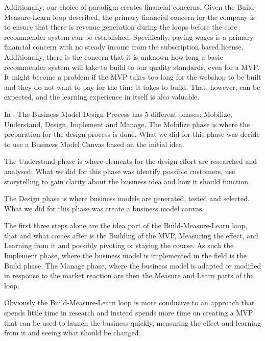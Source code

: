 Additionally, our choice of paradigm creates financial concerns. 
Given the Build-Measure-Learn loop described, the primary financial concern for the company is to ensure that there is revenue generation during the loops before the core recommender system can be established. 
Specifically, paying wages is a primary financial concern with no steady income from the subscription based license. 
Additionally, there is the concern that it is unknown how long a basic recommender system will take to build to our quality standards, even for a MVP.
It might become a problem if the MVP takes too long for the webshop to be built and they do not want to pay for the time it takes to build. That, however, can be expected, and the learning experience in itself is also valuable.

In \citet[pg. 241-261]{osterwalder2010business}, The Business Model Design Process has 5 different phases: Mobilize, Understand, Design, Implement and Manage.
The Mobilize phase is where the preparation for the design process is done.
What we did for this phase was decide to use a Business Model Canvas based on the initial idea.

The Understand phase is where elements for the design effort are researched and analysed. 
What we did for this phase was identify possible customers, use storytelling to gain clarity about the business idea and how it should function.

The Design phase is where business models are generated, tested and selected.
What we did for this phase was create a business model canvas.

The first three steps alone are the idea part of the Build-Measure-Learn loop, that and what comes after is the Building of the MVP, Measuring the effect, and Learning from it and possibly pivoting or staying the course. 
As such the Implement phase, where the business model is implemented in the field is the Build phase.
The Manage phase, where the business model is adapted or modified in response to the market reaction are then the Measure and Learn parts of the loop.

Obviously the Build-Measure-Learn loop is more conducive to an approach that spends little time in research and instead spends more time on creating a MVP that can be used to launch the business quickly, measuring the effect and learning from it and seeing what should be changed.

%
